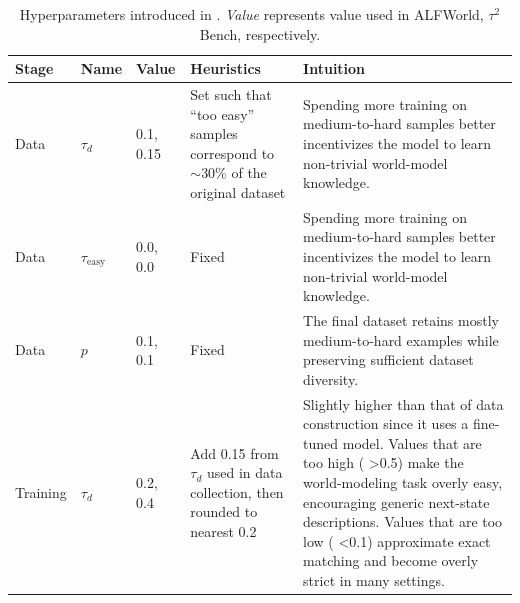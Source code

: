 \begin{table}[t]
    \centering
    \caption{Hyperparameters introduced in \wmrlshort{}. \emph{Value} represents value used in ALFWorld, $\tau^2$ Bench, respectively.}
    \label{tab:rwml_hyperparams}
    \begin{tabular}{l l l p{4.2cm} p{5.2cm}}
        \toprule
        Stage & Name & Value & Heuristics & Intuition \\
        \midrule
        \wmrlshort{} Data
        & $\tau_d$
        & 0.1, 0.15
        & Set such that ``too easy'' samples correspond to $\sim$30\% of the original dataset
        & Spending more training on medium-to-hard samples better incentivizes the model to learn non-trivial world-model knowledge. \\
        
        \wmrlshort{} Data
        & $\tau_{\mathrm{easy}}$
        & 0.0, 0.0
        & Fixed
        & Spending more training on medium-to-hard samples better incentivizes the model to learn non-trivial world-model knowledge. \\
        
        \wmrlshort{} Data
        & $p$
        & 0.1, 0.1
        & Fixed
        & The final dataset retains mostly medium-to-hard examples while preserving sufficient dataset diversity. \\
        \midrule
        
        \wmrlshort{} Training
        & $\tau_d$
        & 0.2, 0.4
        & Add 0.15 from $\tau_d$ used in data collection, then rounded to nearest 0.2
        & Slightly higher than that of data construction since it uses a fine-tuned model. Values that are too high (\eg{} >0.5) make the world-modeling task overly easy, encouraging generic next-state descriptions. Values that are too low (\eg{} <0.1) approximate exact matching and become overly strict in many settings. \\
        \bottomrule
    \end{tabular}
\end{table}